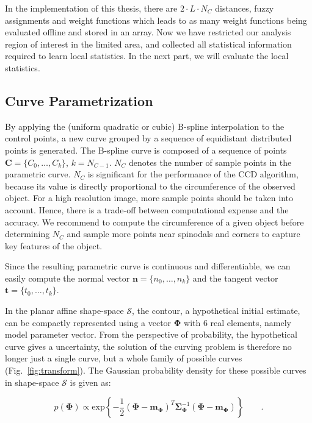 \documentclass[conference]{IEEEtran}
\begin{document}
In the implementation of this thesis,
there are $2 \cdot L \cdot N_C$ distances, fuzzy assignments
and weight functions which leads to as many weight functions being evaluated offline and stored in an array. Now we have restricted our analysis region of interest in the
limited area, and collected all statistical information required to learn
local statistics. In the next part, we will evaluate the local
statistics.

\subsection{Curve Parametrization}
By applying the (uniform quadratic or cubic) B-spline interpolation to the control points, a new curve
grouped by a sequence of equidistant distributed points is generated. 
The B-spline curve %
is composed of a sequence of points $\mathbf{C} = \{C_0, \ldots,
C_{k}\}$, $k = N_{C-1}$. $N_C$ denotes the number of sample points in the
parametric curve. $N_C$ is significant for the
performance of the CCD algorithm, because its value is directly
proportional to the circumference of the observed object. For a high
resolution image, more sample points should be taken into account.
Hence, there is a trade-off between computational expense and the
accuracy. We recommend to compute the circumference of a given object before
determining $N_C$ and sample more points near spinodals and corners to
capture key features of the object.

Since the resulting parametric curve is continuous and
differentiable, we can easily compute the normal vector $\mathbf{n} = \{n_0, \ldots,
n_{k}\}$ and the tangent vector $\mathbf{t} = \{t_0, \ldots, t_{k}\}$.

In the planar affine shape-space $\mathcal{S}$, the contour, a
hypothetical initial estimate, can be compactly represented using a
vector $\mathbf{\Phi}$ with 6 real elements, namely model
parameter vector. From the perspective of probability, the hypothetical
curve gives a uncertainty, the solution of the curving problem is
therefore no longer just a single curve, but a whole family of
possible curves (Fig.~\ref{fig:transform}). The Gaussian probability density for these possible
curves in shape-space $\mathcal{S}$ is given as:

\begin{equation}
  \label{eq:prior}
   p(\mathbf{\Phi}) \propto
\mathrm{exp} \left\{ -\frac{1}{2} (\mathbf{\Phi} -
  \mathbf{m}_{\mathbf{\Phi}})^T \mathbf{\Sigma}_{\mathbf{\Phi}}^{-1} (\mathbf{\Phi} -
  \mathbf{m}_{\mathbf{\Phi}}) \right\}\qquad.
\end{equation}
\end{document}
